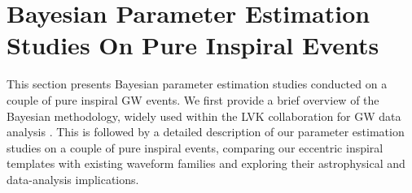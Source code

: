 \documentclass[aps,prd,twocolumn,superscriptaddress,groupedaddress,nofootinbib,showpacs,eqsecnum,useAms]{revtex4-2}
\begin{document}

\section{Bayesian Parameter Estimation Studies On Pure Inspiral Events}
\label{sec:data_analysis}

This section presents Bayesian parameter estimation studies conducted on a couple of pure inspiral GW events. We first provide a brief overview of the Bayesian methodology, widely used within the LVK collaboration for GW data analysis \cite{creightonanderson2011, Sivia2006, bilby_paper}.
This is followed by a detailed description of our parameter estimation studies on a couple of pure inspiral events, comparing our eccentric inspiral templates with existing waveform families and exploring their astrophysical and data-analysis implications.
\end{document}
